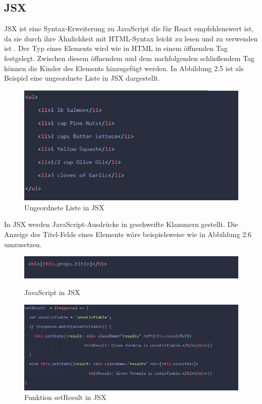 \subsection{JSX}
JSX ist eine Syntax-Erweiterung zu JavaScript die für React empfehlenswert ist, da sie durch ihre Ähnlichkeit mit HTML-Syntax leicht zu lesen und zu verwenden ist \cite{5}. Der Typ eines Elements wird wie in HTML in einem öffnenden Tag festgelegt. Zwischen diesem öffnendem und dem nachfolgenden schließendem Tag können die Kinder des Elements hinzugefügt werden. In Abbildung 2.5 ist als Beispiel eine ungeordnete Liste in JSX dargestellt.
\begin{figure}[!thb]
     \centerline{\includegraphics[width=12cm]{../Abbildungen/jsxList.png}}
  \caption{Ungeordnete Liste in JSX \cite{eig}}
  \label{Ungeordnete Liste in JSX}
\end{figure}
In JSX werden JavaScript-Ausdrücke in geschweifte Klammern gestellt. Die Anzeige des Titel-Felds eines Elements wäre beispielsweise wie in Abbildung 2.6 umzusetzen.\\ 
\begin{figure}[H]
     \centerline{\includegraphics[width=12cm]{../Abbildungen/jsxExpression.png}}
  \caption{JavaScript in JSX \cite{eig}}
  \label{JavaScript in JSX}
  \centerline{}
     \centerline{\includegraphics[width=12cm]{../Abbildungen/jsxSetResult.png}}
  \caption{Funktion setResult in JSX \cite{eig}}
  \label{Funktion setResult in JSX}
\end{figure}
